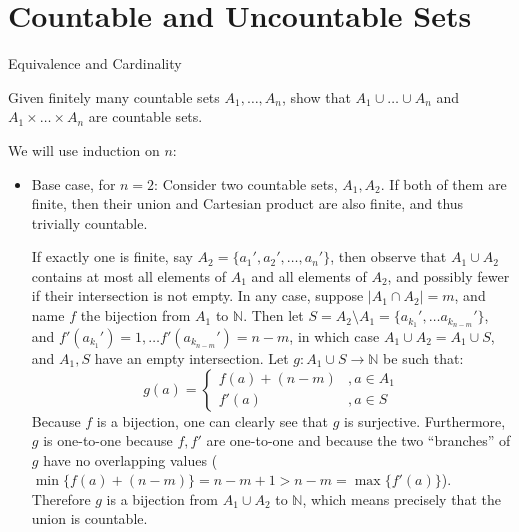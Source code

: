 \chapter{Countable and Uncountable Sets}

\begin{section}{Equivalence and Cardinality}

\begin{exercise}{3}
    Given finitely many countable sets $A_1, \ldots, A_n$, show that $A_1 \cup \ldots \cup A_n$ and $A_1 \times \ldots \times A_n$ are countable sets.
\end{exercise}

\begin{solution}

    We will use induction on $n$:
    \begin{itemize}
        \item Base case, for $n = 2$: Consider two countable sets, $A_1, A_2$. If both of them are finite, then their union and Cartesian product are also finite, and thus trivially countable.
        
        If exactly one is finite, say $A_2 = \{a_1', a_2', \ldots, a_n'\}$, then observe that $A_1 \cup A_2$ contains at most all elements of $A_1$ and all elements of $A_2$, and possibly fewer if their intersection is not empty.
        In any case, suppose $\lvert A_1 \cap A_2 \rvert = m$, and name $f$ the bijection from $A_1$ to $\mathbb{N}$.
        Then let $S = A_2 \setminus A_1 = \{a_{k_1}', \ldots a_{k_{n-m}}'\}$, and $f'(a_{k_1}') = 1, \ldots f'(a_{k_{n-m}}') = n - m$, in which case $A_1 \cup A_2 = A_1 \cup S$, and $A_1, S$ have an empty intersection.
        Let $g: A_1 \cup S \rightarrow \mathbb{N}$ be such that:
        $$g(a) = \begin{cases} 
            f(a) + (n - m) &, a \in A_1 \\
            f'(a) &, a \in S
            \end{cases}$$
        Because $f$ is a bijection, one can clearly see that $g$ is surjective.
        Furthermore, $g$ is one-to-one because $f, f'$ are one-to-one and because the two ``branches'' of $g$ have no overlapping values ($\min\{f(a) + (n-m)\} = n - m + 1> n - m =\max\{f'(a)\}$).
        Therefore $g$ is a bijection from $A_1 \cup A_2$ to $\mathbb{N}$, which means precisely that the union is countable.


\end{itemize}
\end{solution}
\end{section}
